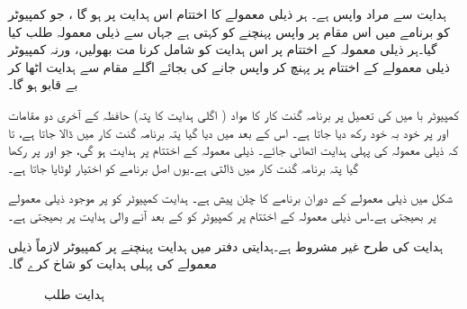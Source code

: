 ہدایت \sRET سے مراد واپس   ہے۔ ہر ذیلی معمولے  کا اختتام اس ہدایت پر ہو گا ، جو کمپیوٹر کو برنامے میں اس مقام پر واپس پہنچنے کو کہتی ہے جہاں سے  ذیلی معمولہ طلب کیا گیا۔ہر ذیلی معمولہ کے اختتام پر اس ہدایت کو شامل کرنا مت  بھولیں، ورنہ کمپیوٹر ذیلی معمولے کے اختتام پر پہنچ کر واپس جانے کی بجائے اگلے مقام سے ہدایت اٹھا کر  بے قابو ہو گا۔

کمپیوٹر با میں \sCALL کی تعمیل پر برنامہ گنت کار کا مواد  ( اگلی ہدایت کا پتہ)  حافظہ  کے آخری دو مقامات   اور  پر  خود بہ خود    رکھ دیا جاتا ہے۔ اس کے بعد \sCALL میں دیا گیا پتہ برنامہ گنت کار میں ڈالا جاتا ہے، تا کہ ذیلی معمولہ کی پہلی ہدایت  اٹھائی جائے۔ ذیلی معمولہ  کے اختتام پر \sRET ہدایت  ہو گی، جو  اور   پر رکھا گیا  پتہ برنامہ گنت کار میں ڈالتی ہے۔یوں اصل برنامے  کو اختیار   لوٹایا جاتا ہے۔ 

شکل   میں  ذیلی معمولے  کے دوران برنامے کا چلن پیش ہے۔  ہدایت  کمپیوٹر کو  پر موجود ذیلی معمولے  پر بھیجتی ہے۔اس ذیلی معمولہ کے اختتام پر \sRET کمپیوٹر کو  \sCALL کے بعد آنے والی ہدایت پر بھیجتی ہے۔

ہدایت \sJMP کی طرح \sCALL غیر مشروط ہے۔ہدایتی دفتر میں  \sCALL  ہدایت  پہنچنے پر کمپیوٹر لازماً ذیلی معمولے کی پہلی ہدایت کو شاخ کرے گا۔

\begin{figure}
\centering
{}
\caption{ہدایت طلب}
\label{شکل_کمپیوٹر_با_ہدایت_طلب}
\end{figure}

